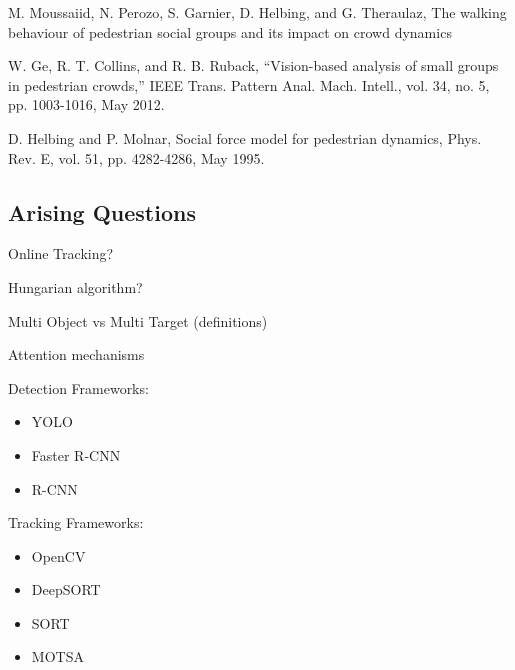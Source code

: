 M. Moussaiid, N. Perozo, S. Garnier, D. Helbing, and G. Theraulaz, The walking behaviour of pedestrian social groups and its impact on crowd dynamics

W. Ge, R. T. Collins, and R. B. Ruback, “Vision-based analysis of small groups in pedestrian crowds,” IEEE Trans. Pattern Anal. Mach. Intell., vol. 34, no. 5, pp. 1003-1016, May 2012.

D. Helbing and P. Molnar, Social force model for pedestrian dynamics, Phys. Rev. E, vol. 51, pp. 4282-4286, May 1995.

\subsection{Arising Questions}

Online Tracking?

Hungarian algorithm?

Multi Object vs Multi Target (definitions)

Attention mechanisms

Detection Frameworks:
\begin{itemize}
    \item YOLO
    \item Faster R-CNN
    \item R-CNN
\end{itemize}

Tracking Frameworks:
\begin{itemize}
    \item OpenCV
    \item DeepSORT
    \item SORT
    \item MOTSA
\end{itemize}